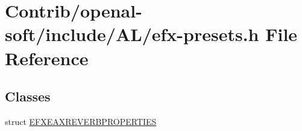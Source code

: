 \hypertarget{efx-presets_8h}{}\section{Contrib/openal-\/soft/include/\+A\+L/efx-\/presets.h File Reference}
\label{efx-presets_8h}
\subsection*{Classes}
\begin{DoxyCompactItemize}
\item 
struct \mbox{\hyperlink{struct_e_f_x_e_a_x_r_e_v_e_r_b_p_r_o_p_e_r_t_i_e_s}{E\+F\+X\+E\+A\+X\+R\+E\+V\+E\+R\+B\+P\+R\+O\+P\+E\+R\+T\+I\+ES}}
\end{DoxyCompactItemize}

